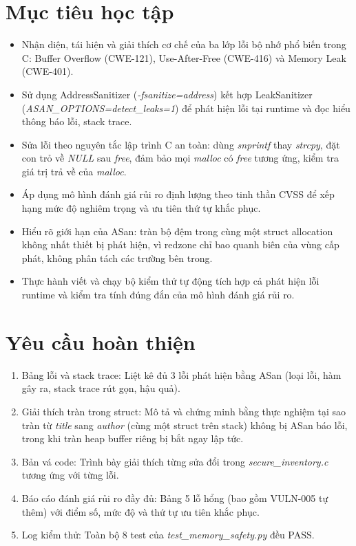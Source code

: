 \section*{Mục tiêu học tập}

\begin{itemize}
    \item Nhận diện, tái hiện và giải thích cơ chế của ba lớp lỗi bộ nhớ phổ
          biến trong C: Buffer Overflow (CWE-121), Use-After-Free (CWE-416) và
          Memory Leak (CWE-401).
    \item Sử dụng AddressSanitizer (\textit{-fsanitize=address}) kết hợp
          LeakSanitizer (\textit{ASAN\_OPTIONS=detect\_leaks=1}) để phát hiện lỗi
          tại runtime và đọc hiểu thông báo lỗi, stack trace.
    \item Sửa lỗi theo nguyên tắc lập trình C an toàn: dùng \textit{snprintf}
          thay \textit{strcpy}, đặt con trỏ về \textit{NULL} sau \textit{free},
          đảm bảo mọi \textit{malloc} có \textit{free} tương ứng, kiểm tra
          giá trị trả về của \textit{malloc}.
    \item Áp dụng mô hình đánh giá rủi ro định lượng theo tinh thần CVSS để
          xếp hạng mức độ nghiêm trọng và ưu tiên thứ tự khắc phục.
    \item Hiểu rõ giới hạn của ASan: tràn bộ đệm trong cùng một struct
          allocation không nhất thiết bị phát hiện, vì redzone chỉ bao quanh
          biên của vùng cấp phát, không phân tách các trường bên trong.
    \item Thực hành viết và chạy bộ kiểm thử tự động tích hợp cả phát hiện lỗi
          runtime và kiểm tra tính đúng đắn của mô hình đánh giá rủi ro.
\end{itemize}

\section*{Yêu cầu hoàn thiện}

\begin{enumerate}
    \item Bảng lỗi và stack trace: Liệt kê đủ 3 lỗi phát hiện bằng ASan
          (loại lỗi, hàm gây ra, stack trace rút gọn, hậu quả).
    \item Giải thích tràn trong struct: Mô tả và chứng minh bằng thực
          nghiệm tại sao tràn từ \textit{title} sang \textit{author} (cùng một
          struct trên stack) không bị ASan báo lỗi, trong khi tràn heap buffer
          riêng bị bắt ngay lập tức.
    \item Bản vá code: Trình bày giải thích từng sửa đổi trong
          \textit{secure\_inventory.c} tương ứng với từng lỗi.
    \item Báo cáo đánh giá rủi ro đầy đủ: Bảng 5 lỗ hổng (bao gồm
          VULN-005 tự thêm) với điểm số, mức độ và thứ tự ưu tiên khắc phục.
    \item Log kiểm thử: Toàn bộ 8 test của
          \textit{test\_memory\_safety.py} đều PASS.
\end{enumerate}

